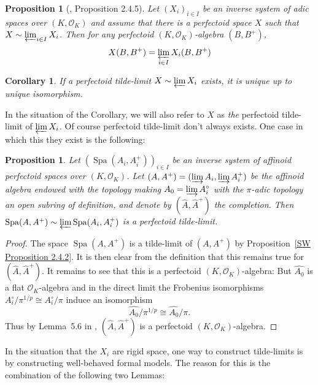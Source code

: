 \documentclass[10pt,oneside]{amsart}
\newtheorem{proposition}[theorem]{Proposition}
\newtheorem{corollary}[theorem]{Corollary}
\theoremstyle{definition}
\begin{document}
\begin{proposition}[\cite{SW}, Proposition 2.4.5]\label{SW Proposition 2.4.5}
	Let $(X_i)_{i\in I}$ be an inverse system of adic spaces over $(K,\mathcal O_K)$ and assume that there is a perfectoid space $X$ such that $X\sim \varprojlim_{i\in I} X_i$. Then for any perfectoid $(K,\mathcal O_K)$-algebra $(B,B^{+})$, 
	\[X(B,B^{+})  = \varprojlim_{i\in I}X_i(B,B^{+})\]
\end{proposition}
\begin{corollary}\label{corollary: perfectoid tilde limit is unique}
	If a perfectoid tilde-limit $X\sim \varprojlim X_i$ exists, it is unique up to unique isomorphism.
\end{corollary}
In the situation of the Corollary, we will also refer to $X$ as \textit{the} perfectoid tilde-limit of $ \varprojlim X_i$. Of course perfectoid tilde-limit don't always exists. One case in which this they exist is the following:
\begin{proposition}\label{proposition: tilde-limits of perfectoid spaces}
	Let $(\operatorname{Spa}(A_i,A_i^{+}))_{i\in I}$ be an inverse system of affinoid perfectoid spaces over $(K,\mathcal O_K)$. 
	Let $(A,A^{+}) = (\varinjlim A_i,\varinjlim A_i^{+})$ be the affinoid algebra endowed with the topology making $A_0=\varinjlim A_i^{\circ}$ with the $\pi$-adic topology an open subring of definition, and denote by $(\hat{A},\hat{A}^+)$ the completion. Then $\operatorname{Spa}(A,A^{+})\sim \varprojlim \operatorname{Spa}(A_i,A_i^{+})$ is a perfectoid tilde-limit.
\end{proposition}
\begin{proof}
	The space $\operatorname{Spa}(A,A^{+})$ is a tilde-limit of $(A,A^{+})$ by Proposition~\ref{SW Proposition 2.4.2}. It is then clear from the definition that this remains true for $(\hat{A},\hat{A}^{+})$. It remains to see that this is a perfectoid $(K,\mathcal O_K)$-algebra: But $\hat{A_0}$ is a flat $\mathcal O_K$-algebra and in the direct limit the Frobenius isomorphisms $A_i^{\circ}/\pi^{1/p}\cong A_i^{\circ}/\pi$ induce an isomorphism
	\[\hat{A_0}/\pi^{1/p}\cong \hat{A_0}/\pi.\]
	Thus by Lemma~5.6 in \cite{perfectoid}, $(\hat{A},\hat{A}^+)$ is a perfectoid $(K,\mathcal O_K)$-algebra. 
\end{proof}
	

In the situation that the $X_i$ are rigid space, one way to construct tilde-limits is by constructing well-behaved formal models. The reason for this is the combination of the following two Lemmas:
\end{document}
